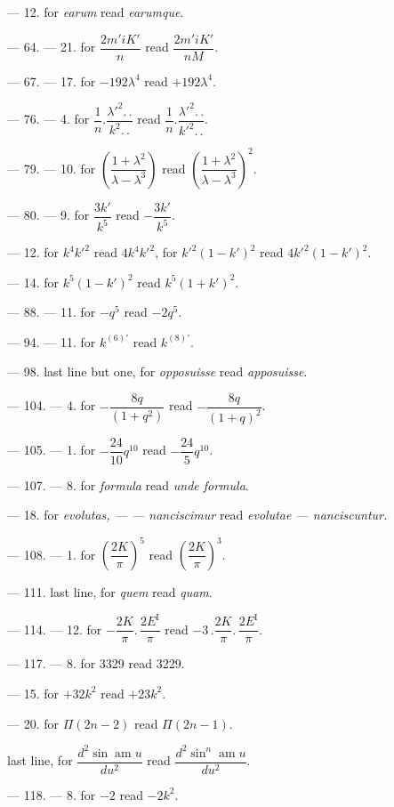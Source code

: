 \documentclass{article}
\begin{document}
--- 12. for \emph{earum} read \emph{earumque}.

--- 64. --- 21. for $\dfrac{2m'iK'}{n}$ read $\dfrac{2m'iK'}{nM}$.

--- 67. --- 17. for $-192\lambda^{4}$ read $+192\lambda^{4}$.

--- 76. --- 4. for $\dfrac{1}{n}.\dfrac{\lambda'^{2}.\,.}{k^{2}.\,.}$ read $\dfrac{1}{n}.\dfrac{\lambda'^{2}.\,.}{k'^{2}.\,.}$.

--- 79. --- 10. for $\left(\dfrac{1+\lambda^{2}}{\lambda-\lambda^{3}}\right)$ read $\left(\dfrac{1+\lambda^{2}}{\lambda-\lambda^{3}}\right)^{2}$.

--- 80. --- 9. for $\dfrac{3k'}{k^{5}}$ read $-\dfrac{3k'}{k^{5}}$.

--- 12. for $k^{4}k'^{2}$ read $4k^{4}k'^{2}$, for $k'^{2}(1-k')^{2}$ read $4k'^{2}(1-k')^{2}$.

--- 14. for $k^{5}(1-k')^{2}$ read $k^{5}(1+k')^{2}$.

--- 88. --- 11. for $-q^{5}$ read $-2q^{5}$.

--- 94. --- 11. for $k^{(6)\prime}$ read $k^{(8)\prime}$.

--- 98. last line but one, for \emph{opposuisse} read \emph{apposuisse}.

--- 104. --- 4. for $-\dfrac{8q}{(1+q^{2})}$ read $-\dfrac{8q}{(1+q)^{2}}$.

--- 105. --- 1. for $-\dfrac{24}{10}q^{10}$ read $-\dfrac{24}{5}q^{10}$.

--- 107. --- 8. for \emph{formula} read \emph{unde formula}.

--- 18. for \emph{evolutas, --- --- nanciscimur} read \emph{evolutae --- nanciscuntur.}

--- 108. --- 1. for $\left(\dfrac{2K}{\pi}\right)^{5}$ read $\left(\dfrac{2K}{\pi}\right)^{3}$.

--- 111. last line, for \emph{quem} read \emph{quam}.

--- 114. --- 12. for $-\dfrac{2K}{\pi}.\,\dfrac{2E^{\mathrm{I}}}{\pi}$ read $-3\,.\dfrac{2K}{\pi}.\,\dfrac{2E^{\mathrm{I}}}{\pi}$.

--- 117. --- 8. for 3329 read 3229.

--- 15. for $+32k^{2}$ read $+23k^{2}$.

--- 20. for $\Pi(2n-2)$ read $\Pi(2n-1)$.

last line, for $\dfrac{d^{2}\sin\operatorname{am}u}{du^{2}}$ read $\dfrac{d^{2}\sin^{n}\operatorname{am}u}{du^{2}}$.

--- 118. --- 8. for $-2$ read $-2k^{2}$.
\end{document}
